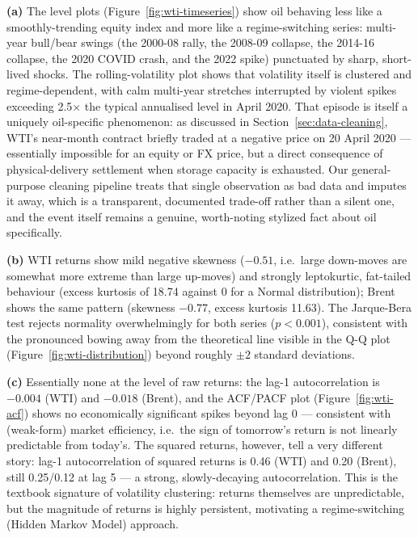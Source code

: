 \textbf{(a)}
The level plots (Figure~\ref{fig:wti-timeseries}) show oil behaving less like
a smoothly-trending equity index and more like a regime-switching series:
multi-year bull/bear swings (the 2000-08 rally, the 2008-09 collapse, the
2014-16 collapse, the 2020 COVID crash, and the 2022 spike) punctuated by
sharp, short-lived shocks. The rolling-volatility plot shows that volatility
itself is clustered and regime-dependent, with calm multi-year stretches
interrupted by violent spikes exceeding 2.5$\times$ the typical annualised
level in April 2020. That episode is itself a uniquely oil-specific
phenomenon: as discussed in Section~\ref{sec:data-cleaning}, WTI's
near-month contract briefly traded at a negative price on 20 April
2020 — essentially impossible for an equity or FX price, but a direct
consequence of physical-delivery settlement when storage capacity is
exhausted. Our general-purpose cleaning pipeline treats that single
observation as bad data and imputes it away, which is a transparent,
documented trade-off rather than a silent one, and the event itself remains
a genuine, worth-noting stylized fact about oil specifically.

\textbf{(b)} WTI returns show mild negative skewness ($-0.51$, i.e.\ large
down-moves are somewhat more extreme than large up-moves) and strongly
leptokurtic, fat-tailed behaviour (excess kurtosis of 18.74 against 0 for a
Normal distribution); Brent shows the same pattern (skewness $-0.77$, excess
kurtosis 11.63). The Jarque-Bera test rejects normality overwhelmingly for
both series ($p < 0.001$), consistent with the pronounced bowing away from
the theoretical line visible in the Q-Q plot (Figure~\ref{fig:wti-distribution})
beyond roughly $\pm 2$ standard deviations.

\textbf{(c)} Essentially none at the level of raw returns: the lag-1 autocorrelation is $-0.004$
(WTI) and $-0.018$ (Brent), and the ACF/PACF plot
(Figure~\ref{fig:wti-acf}) shows no economically significant spikes beyond
lag 0 — consistent with (weak-form) market efficiency, i.e.\ the sign of
tomorrow's return is not linearly predictable from today's. The squared returns, however, tell a very different story: lag-1 autocorrelation of squared returns is 0.46 (WTI) and 0.20 (Brent), still 0.25/0.12 at lag 5 — a strong, slowly-decaying autocorrelation. This is the
textbook signature of volatility clustering: returns themselves are unpredictable, but the magnitude of returns is highly persistent, motivating a regime-switching (Hidden Markov Model) approach.

